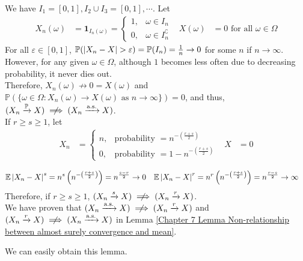 \documentclass{huhtakm-template-book}
\newcommand{\prob}{\mathbb{P}}
\newcommand{\expect}{\mathbb{E}}
\begin{document}
\begin{proofing}
\begin{enumerate}
        We have $I_{1}=[0,1], I_{2}\cup I_{3}=[0,1],\cdots$. Let
        \begin{align*}
            X_{n}(\omega)&=\mathbf{1}_{I_{n}(\omega)}=\begin{cases}
                1, &\omega\in I_{n}\\
                0, &\omega\in I_{n}^{\complement}
            \end{cases} & X(\omega)&=0\text{ for all }\omega\in\Omega
        \end{align*}
        For all $\varepsilon\in[0,1]$, $\prob(\abs{X_{n}-X}>\varepsilon)=\prob(I_{n})=\frac{1}{n}\to 0$ for some $n$ if $n\to\infty$.\\
        However, for any given $\omega\in\Omega$, although $1$ becomes less often due to decreasing probability, it never dies out.\\
        Therefore, $X_{n}(\omega)\not\to 0=X(\omega)$ and $\prob(\{\omega\in\Omega:X_{n}(\omega)\to X(\omega)\text{ as }n\to\infty\})=0$, and thus, $(X_{n}\xrightarrow{\prob}X)\centernot\implies(X_{n}\xrightarrow{\text{a.s.}}X)$.\\
        If $r\geq s\geq 1$, let
        \begin{align*}
            X_{n}&=\begin{cases}
                n, &\text{probability }=n^{-\left(\frac{r+s}{2}\right)}\\
                0, &\text{probability }=1-n^{-\left(\frac{r+s}{2}\right)}
            \end{cases} & X&=0
        \end{align*}

        \begin{align*}
            \expect\abs{X_{n}-X}^{s}&=n^{s}\left(n^{-\left(\frac{r+s}{2}\right)}\right)=n^{\frac{s-r}{2}}\to 0 & \expect\abs{X_{n}-X}^{r}&=n^{r}\left(n^{-\left(\frac{r+s}{2}\right)}\right)=n^{\frac{r-s}{2}}\to\infty
        \end{align*}
        Therefore, if $r\geq s\geq 1$, $(X_{n}\xrightarrow{s}X)\centernot\implies(X_{n}\xrightarrow{r}X)$.\\
        We have proven that $(X_{n}\xrightarrow{\text{a.s.}}X)\centernot\implies(X_{n}\xrightarrow{r}X)$ and $(X_{n}\xrightarrow{r}X)\centernot\implies(X_{n}\xrightarrow{\text{a.s.}}X)$ in Lemma \ref{Chapter 7 Lemma Non-relationship between almost surely convergence and mean}.
    \end{enumerate}
\end{proofing}
We can easily obtain this lemma.
\end{document}
